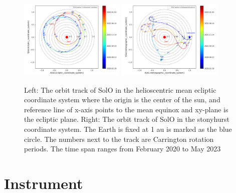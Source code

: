 \begin{figure}
    \centering
    \includegraphics[width=0.45\textwidth]{images/ACR/SOLO_orbit_track_helioscentric_3.png}
    \includegraphics[width = 0.45\textwidth]{images/ACR/SOLO_orbit_stonyhurst_3.png}
    \caption[Orbit track of \ac{Solo}]{Left: The orbit track of \ac{SolO} in the helioscentric mean ecliptic coordinate system where the origin is the center of the sun, and reference line of x-axis points to the mean equinox and xy-plane is the ecliptic plane. Right: The orbit track of \ac{SolO} in the stonyhurst coordinate system. The Earth is fixed at 1 au is marked as the blue circle. 
    The numbers next to the track are Carrington rotation periods. The time span ranges from February 2020 to May 2023}
    \label{fig:SOLO_orbit_track}
\end{figure}




\section{Instrument}


